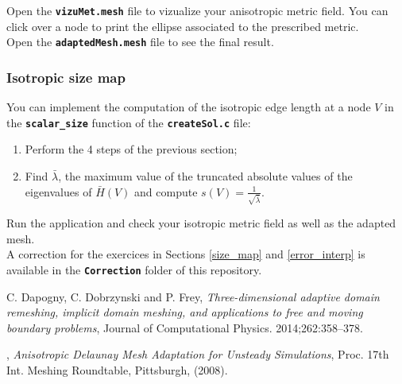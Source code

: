 \documentclass{article}
\newcommand{\ttb}[1]{\texttt{\textbf{#1}}}
\begin{document}
Open the \ttb{vizuMet.mesh} file to vizualize your anisotropic metric field.
You can click over a node to print the ellipse associated to the prescribed metric.\\

Open the \ttb{adaptedMesh.mesh} file to see the final result.

\subsubsection{Isotropic size map}
You can implement the computation of the isotropic edge length at a
node $V$ in the \ttb{scalar\_size} function of the \ttb{createSol.c}
file:

\begin{enumerate}
\item Perform the 4 steps of the previous section;
\item Find $\bar{\lambda}$, the maximum value of the truncated absolute values
  of the eigenvalues of $\bar{H}(V)$ and compute
  $ s(V) = \frac{1}{\sqrt{\bar{\lambda}}}$.
\end{enumerate}
Run the application and check your isotropic metric
field as well as the adapted mesh.\\

A correction for the exercices in Sections \ref{size_map} and
\ref{error_interp} is available in the \ttb{Correction} folder of this repository.

\begin{thebibliography}{00}

{\sc C. Dapogny, C. Dobrzynski and P. Frey}, {\em Three-dimensional adaptive domain remeshing,
  implicit domain meshing, and applications to free and moving boundary
  problems}, Journal of Computational Physics. 2014;\hspace{0pt}262:358--378.

, {\em Anisotropic Delaunay Mesh Adaptation for Unsteady Simulations}, Proc. 17th Int. Meshing Roundtable, Pittsburgh, (2008).

\end{thebibliography}
\end{document}
